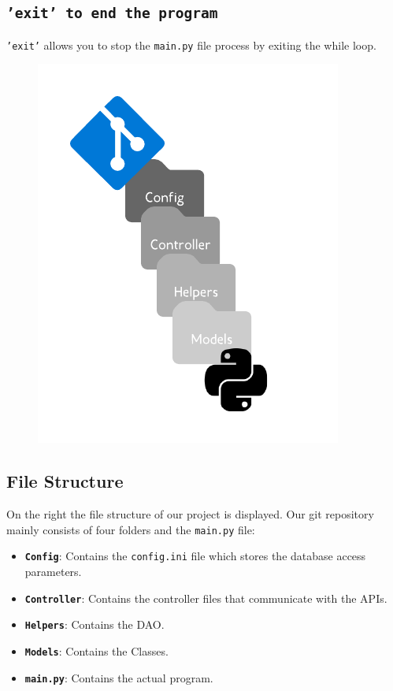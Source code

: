 \documentclass[11pt,a4paper,notitlepage]{article}
\begin{document}
\subsection*{\texttt{'exit' to end the program}}
\texttt{'exit'} allows you to stop the \texttt{main.py} file process by exiting the while loop.
\begin{figure}
  \begin{center}
    \includegraphics[scale = 1.2]{file_structure.png}
  \end{center}
\end{figure}

\subsection*{File Structure}


On the right the file structure of our project is displayed. Our git repository mainly consists of four folders and the \texttt{main.py} file:
\begin{itemize}
\item \textbf{\texttt{Config}}: Contains the \texttt{config.ini} file which stores the database access parameters.
\item \textbf{\texttt{Controller}}: Contains the controller files that communicate with the APIs.
\item \textbf{\texttt{Helpers}}: Contains the DAO. 
\item \textbf{\texttt{Models}}: Contains the Classes.
\item \textbf{\texttt{main.py}}: Contains the actual program.
\end{itemize}
\newpage
\end{document}
